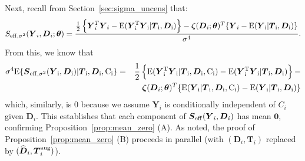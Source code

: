 \documentclass[12pt]{article}
\def\bse{\begin{eqnarray*}}
\def\ese{\end{eqnarray*}}
\def\bse{\begin{eqnarray*}}
\def\ese{\end{eqnarray*}}
\def\bS{{\mathbf S}}
\def\bzero{{\mathbf 0}}
\newcommand{\bzeta}{\mbox{\boldmath $\zeta$}}
\def\btheta{{\boldsymbol{\theta}}}
\def\bzero{{\boldsymbol{0}}}
\def\bD{{\boldsymbol D}}
\def\bS{{\boldsymbol S}}
\def\bT{{\boldsymbol T}}
\def\bY{{\boldsymbol Y}}
\def\tilD{\bD}
\def\E{\rm E}
\begin{document}
Next, recall from Section~\ref{sec:sigma_uncens} that: 
\bse
S_{\rm{eff},\sigma^2}(\bY_i,\tilD_i;\btheta)=\frac{\frac{1}{2}\left\{\bY_i^T\bY_i-\E(\bY_i^T\bY_i|\bT_i,\tilD_i)\right\}-\bzeta(\tilD_i;\btheta)^T\{\bY_i-\E(\bY_i|\bT_i,\tilD_i)\}}{\sigma^4}.
\ese
From this, we know that
\bse
\sigma^4\E\{\bS_{\rm{eff,\sigma^2}}(\bY_i,\tilD_i)|\bT_i,\tilD_i,C_i\}&=&\frac{1}{2}\left\{\E(\bY_i^T\bY_i|\bT_i,\tilD_i,C_i)-\E(\bY_i^T\bY_i|\bT_i,\tilD_i)\right\}-\\
&&\bzeta(\tilD_i;\btheta)^T\{\E(\bY_i|\bT_i,\tilD_i,C_i)-\E(\bY_i|\bT_i,\tilD_i)\}
\ese
which, similarly, is $0$ because we assume $\bY_i$ is conditionally independent of $C_i$ given $\tilD_i$. This establishes that each component of $\bS_{\rm eff}(\bY_i,\tilD_i)$ has mean $\bzero$, confirming Proposition~\ref{prop:mean_zero} (A). As noted, the proof of  Proposition~\ref{prop:mean_zero} (B) proceeds in parallel (with $(\tilD_i, \bT_i)$ replaced by $(\widehat{\tilD}_i, \bT_i^{\rm aug})$).


\end{document}
